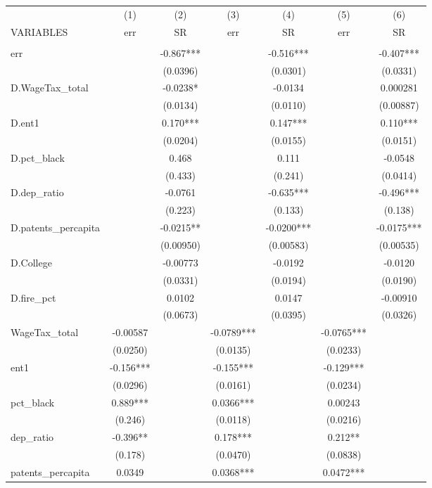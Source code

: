 \begin{tabular}{lcccccc} \hline
 & (1) & (2) & (3) & (4) & (5) & (6) \\
VARIABLES & err & SR & err & SR & err & SR \\ \hline
 &  &  &  &  &  &  \\
err &  & -0.867*** &  & -0.516*** &  & -0.407*** \\
 &  & (0.0396) &  & (0.0301) &  & (0.0331) \\
D.WageTax\_total &  & -0.0238* &  & -0.0134 &  & 0.000281 \\
 &  & (0.0134) &  & (0.0110) &  & (0.00887) \\
D.ent1 &  & 0.170*** &  & 0.147*** &  & 0.110*** \\
 &  & (0.0204) &  & (0.0155) &  & (0.0151) \\
D.pct\_black &  & 0.468 &  & 0.111 &  & -0.0548 \\
 &  & (0.433) &  & (0.241) &  & (0.0414) \\
D.dep\_ratio &  & -0.0761 &  & -0.635*** &  & -0.496*** \\
 &  & (0.223) &  & (0.133) &  & (0.138) \\
D.patents\_percapita &  & -0.0215** &  & -0.0200*** &  & -0.0175*** \\
 &  & (0.00950) &  & (0.00583) &  & (0.00535) \\
D.College &  & -0.00773 &  & -0.0192 &  & -0.0120 \\
 &  & (0.0331) &  & (0.0194) &  & (0.0190) \\
D.fire\_pct &  & 0.0102 &  & 0.0147 &  & -0.00910 \\
 &  & (0.0673) &  & (0.0395) &  & (0.0326) \\
WageTax\_total & -0.00587 &  & -0.0789*** &  & -0.0765*** &  \\
 & (0.0250) &  & (0.0135) &  & (0.0233) &  \\
ent1 & -0.156*** &  & -0.155*** &  & -0.129*** &  \\
 & (0.0296) &  & (0.0161) &  & (0.0234) &  \\
pct\_black & 0.889*** &  & 0.0366*** &  & 0.00243 &  \\
 & (0.246) &  & (0.0118) &  & (0.0216) &  \\
dep\_ratio & -0.396** &  & 0.178*** &  & 0.212** &  \\
 & (0.178) &  & (0.0470) &  & (0.0838) &  \\
patents\_percapita & 0.0349 &  & 0.0368*** &  & 0.0472*** &  \\

\end{tabular}
